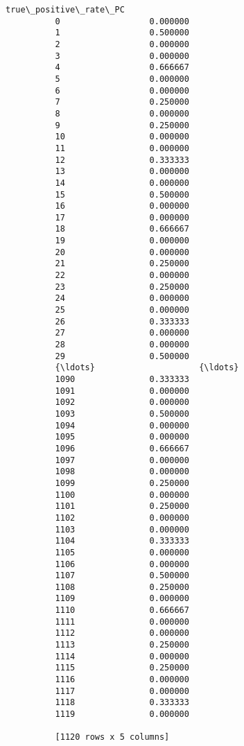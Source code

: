 \documentclass[11pt]{article}
\begin{document}
\begin{Verbatim}[commandchars=\\\{\}]
                true\_positive\_rate\_PC  
          0                  0.000000  
          1                  0.500000  
          2                  0.000000  
          3                  0.000000  
          4                  0.666667  
          5                  0.000000  
          6                  0.000000  
          7                  0.250000  
          8                  0.000000  
          9                  0.250000  
          10                 0.000000  
          11                 0.000000  
          12                 0.333333  
          13                 0.000000  
          14                 0.000000  
          15                 0.500000  
          16                 0.000000  
          17                 0.000000  
          18                 0.666667  
          19                 0.000000  
          20                 0.000000  
          21                 0.250000  
          22                 0.000000  
          23                 0.250000  
          24                 0.000000  
          25                 0.000000  
          26                 0.333333  
          27                 0.000000  
          28                 0.000000  
          29                 0.500000  
          {\ldots}                     {\ldots}  
          1090               0.333333  
          1091               0.000000  
          1092               0.000000  
          1093               0.500000  
          1094               0.000000  
          1095               0.000000  
          1096               0.666667  
          1097               0.000000  
          1098               0.000000  
          1099               0.250000  
          1100               0.000000  
          1101               0.250000  
          1102               0.000000  
          1103               0.000000  
          1104               0.333333  
          1105               0.000000  
          1106               0.000000  
          1107               0.500000  
          1108               0.250000  
          1109               0.000000  
          1110               0.666667  
          1111               0.000000  
          1112               0.000000  
          1113               0.250000  
          1114               0.000000  
          1115               0.250000  
          1116               0.000000  
          1117               0.000000  
          1118               0.333333  
          1119               0.000000  
          
          [1120 rows x 5 columns]
\end{Verbatim}
            
\end{document}
